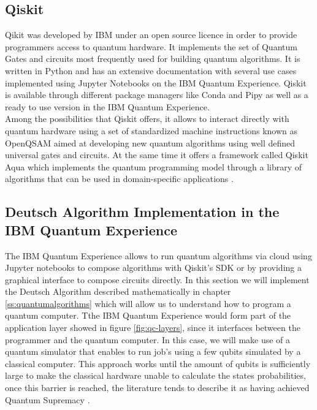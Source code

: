 \documentclass[12pt,a4paper]{scrartcl}
\begin{document}
\subsection{Qiskit}

Qikit was developed by IBM under an open source licence in order to provide programmers access to quantum hardware. It implements the set of Quantum Gates and circuits most frequently used for building quantum algorithms. It is written in Python and has an extensive documentation with several use cases implemented using Jupyter Notebooks on the IBM Quantum Experience. Qiskit is available through different package managers like Conda and Pipy as well as a ready to use version in the IBM Quantum Experience. \\

Among the possibilities that Qiskit offers, it allows to interact directly with quantum hardware using a set of standardized machine instructions known as OpenQSAM \cite{QSAM} aimed at developing new quantum algorithms using well defined universal gates and circuits. At the same time it offers a framework called Qiskit Aqua which implements the quantum programming model through a library of algorithms that can be used in domain-specific applications \cite{QiskitAqua}. 

\subsection{Deutsch Algorithm Implementation in the IBM Quantum Experience}
%
The IBM Quantum Experience \cite{ibm-q-e} allows to run quantum algorithms via cloud using Jupyter notebooks to compose algorithms with Qiskit's SDK or by providing a graphical interface to compose circuits directly. In this section we will implement the Deutsch Algorithm described mathematically in chapter \ref{ss:quantumalgorithms} which will allow us to understand how to program a quantum computer. Tthe IBM Quantum Experience would form part of the application layer showed in figure \ref{fig:qc-layers}, since it interfaces between the programmer and the quantum computer. In this case, we will make use of a quantum simulator that enables to run job's using a few qubits simulated by a classical computer. This approach works until the amount of qubits is sufficiently large to make the classical hardware unable to calculate the states probabilities, once this barrier is reached, the literature tends to describe it as having achieved Quantum Supremacy \cite{Arute2019}.\\
\end{document}
